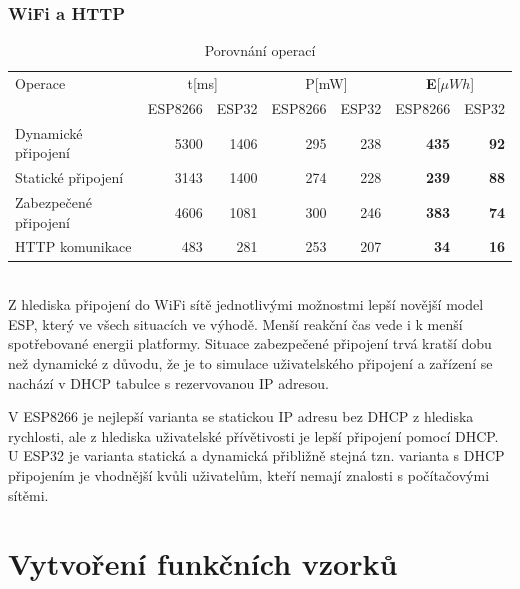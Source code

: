 \documentclass[a4paper, 12pt]{report}
\begin{document}
    \subsection{WiFi a HTTP}
    \begin{table}[h]
        \centering
        \caption{Porovnání operací}
        \begin{tabular}{||l| r r r r |r r||}
            \hline
            Operace & \multicolumn{2}{c}{t[ms]} & \multicolumn{2}{c}{P[mW]} & \multicolumn{2}{c||}{\textbf{E}[$\mu Wh$]} \\
            & ESP8266 & ESP32 & ESP8266 & ESP32 & ESP8266 & ESP32 \\
            \hline
            \hline
            Dynamické připojení   & 5300  & 1406    & 295  & 238     & \textbf{435}&\textbf{92}          \\
            Statické připojení    & 3143  & 1400    & 274  & 228     & \textbf{239}&\textbf{88}          \\
            Zabezpečené připojení & 4606  & 1081    & 300  & 246     & \textbf{383}&\textbf{74}          \\
            HTTP komunikace       & 483  & 281    & 253   & 207     & \textbf{34}&\textbf{16}          \\
            \hline
        \end{tabular}
        \label{tab:porovnani-spotreba-operaci}
    \end{table}\\
    Z hlediska připojení do WiFi sítě jednotlivými možnostmi lepší novější model ESP, který ve všech situacích ve výhodě.
    Menší reakční čas vede i k menší spotřebované energii platformy.
    Situace zabezpečené připojení trvá kratší dobu než dynamické z důvodu, že je to simulace uživatelského připojení a zařízení se nachází v DHCP tabulce s rezervovanou IP adresou.\par
    V ESP8266 je nejlepší varianta se statickou IP adresu bez DHCP z hlediska rychlosti, ale z hlediska uživatelské přívětivosti je lepší připojení pomocí DHCP. U ESP32 je varianta statická a dynamická přibližně stejná tzn. varianta s DHCP připojením je vhodnější kvůli uživatelům, kteří nemají znalosti s počítačovými sítěmi.






    \chapter{Vytvoření funkčních vzorků}
\end{document}
